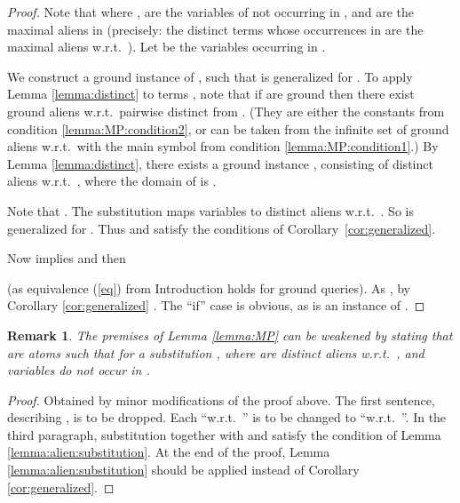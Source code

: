 \documentclass[a4paper]{tlp2}
\newtheorem{remark}[theorem]{Remark}
\begin{document}
\begin{proof}
Note that  where 
,   are the variables 
of  not occurring in , and  are the maximal aliens in  
(precisely: the distinct terms whose occurrences in  are the maximal aliens
w.r.t.\ ).
Let  be the variables occurring in .


We construct a ground instance  of , such that 
 is  generalized for .
To apply Lemma \ref{lemma:distinct} to terms ,
note that if  are ground then there exist  ground aliens
w.r.t.\  pairwise distinct from .
(They are either the constants from condition \ref{lemma:MP:condition2}, 
or can be taken from the infinite set of ground aliens w.r.t.\  with the main
 symbol from condition  \ref{lemma:MP:condition1}.)
By Lemma \ref{lemma:distinct}, 
there exists a ground instance  , 
consisting of  distinct aliens w.r.t.\ ,
where the domain of  is .

Note that
.
The substitution
maps variables  to distinct aliens 
 w.r.t.\ .
So  is  generalized for .
Thus  and  satisfy the conditions of 
Corollary~\ref{cor:generalized}.


Now  implies  and then
 
(as equivalence (\ref{eq}) from Introduction holds for ground queries).
As , by
Corollary \ref{cor:generalized} .
The ``if'' case is obvious, as  is an instance of .
\end{proof}


















\begin{remark}
  The premises of Lemma \ref{lemma:MP} can be weakened by
stating that  are atoms such that  for a substitution
,
where  are distinct aliens w.r.t.\ , and variables
 do not occur in .
\end{remark}

\begin{proof}
Obtained by minor modifications of the proof above.
The first sentence, describing , is to be dropped.
Each ``w.r.t.\ '' is to be changed to ``w.r.t.\ ''.
In the third paragraph, substitution  together with  and
 satisfy the condition of Lemma \ref{lemma:alien:substitution}.
At the end of the proof, 
Lemma \ref{lemma:alien:substitution} should be applied instead of 
Corollary \ref{cor:generalized}.
\end{proof}
\end{document}
